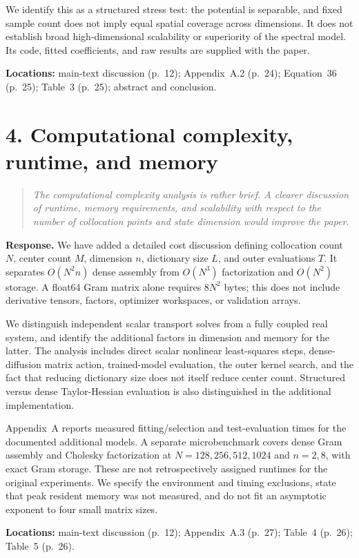 \documentclass[11pt]{article}
\newcommand{\comment}[1]{\begin{quote}\small\itshape #1\end{quote}}
\begin{document}
We identify this as a structured stress test: the potential is separable, and fixed sample count does not imply equal spatial coverage across dimensions. It does not establish broad high-dimensional scalability or superiority of the spectral model. Its code, fitted coefficients, and raw results are supplied with the paper.

\textbf{Locations:} main-text discussion (p.~12); Appendix~A.2 (p.~24); Equation~36 (p.~25); Table~3 (p.~25); abstract and conclusion.

\section*{4. Computational complexity, runtime, and memory}
\comment{The computational complexity analysis is rather brief. A clearer discussion of runtime, memory requirements, and scalability with respect to the number of collocation points and state dimension would improve the paper.}

\textbf{Response.} We have added a detailed cost discussion defining collocation count $N$, center count $M$, dimension $n$, dictionary size $L$, and outer evaluations $T$. It separates $O(N^2n)$ dense assembly from $O(N^3)$ factorization and $O(N^2)$ storage. A float64 Gram matrix alone requires $8N^2$ bytes; this does not include derivative tensors, factors, optimizer workspaces, or validation arrays.

We distinguish independent scalar transport solves from a fully coupled real system, and identify the additional factors in dimension and memory for the latter. The analysis includes direct scalar nonlinear least-squares steps, dense-diffusion matrix action, trained-model evaluation, the outer kernel search, and the fact that reducing dictionary size does not itself reduce center count. Structured versus dense Taylor-Hessian evaluation is also distinguished in the additional implementation.

Appendix~A reports measured fitting/selection and test-evaluation times for the documented additional models. A separate microbenchmark covers dense Gram assembly and Cholesky factorization at $N=128,256,512,1024$ and $n=2,8$, with exact Gram storage. These are not retrospectively assigned runtimes for the original experiments. We specify the environment and timing exclusions, state that peak resident memory was not measured, and do not fit an asymptotic exponent to four small matrix sizes.

\textbf{Locations:} main-text discussion (p.~12); Appendix~A.3 (p.~27); Table~4 (p.~26); Table~5 (p.~26).
\end{document}
